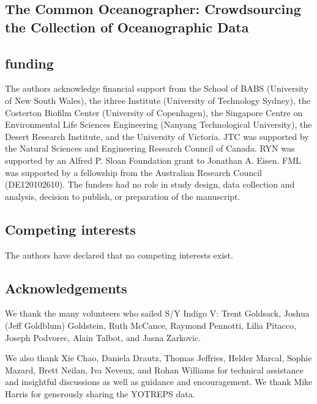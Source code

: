 \begin{refsection}

\chapter{The Common Oceanographer: Crowdsourcing the Collection of Oceanographic Data}










\section{funding}

The authors acknowledge financial support from the School of BABS (University of New South Wales), the ithree Institute (University of Technology Sydney), the Costerton Biofilm Center (University of Copenhagen), the Singapore Centre on Environmental Life Sciences Engineering (Nanyang Technological University), the Desert Research Institute, and the University of Victoria. JTC was supported by the Natural Sciences and Engineering Research Council of Canada. RYN was supported by an Alfred P. Sloan Foundation grant to Jonathan A. Eisen. FML was supported by a fellowship from the Australian Research Council (DE120102610). The funders had no role in study design, data collection and analysis, decision to publish, or preparation of the manuscript.

\section{Competing interests}

The authors have declared that no competing interests exist.

\section{Acknowledgements}

We thank the many volunteers who sailed S/Y Indigo V: Trent Goldsack, Joshua (Jeff Goldblum) Goldstein, Ruth McCance, Raymond Pennotti, Lilia Pitacco, Joseph Podvorec, Alain Talbot, and Jasna Zarkovic.

We also thank Xie Chao, Daniela Drautz, Thomas Jeffries, Helder Marcal, Sophie Mazard, Brett Neilan, Iva Neveux, and Rohan Williams for technical assistance and insightful discussions as well as guidance and encouragement. We thank Mike Harris for generously sharing the YOTREPS data.


\printbibliography[heading=subbibliography]

\end{refsection}
